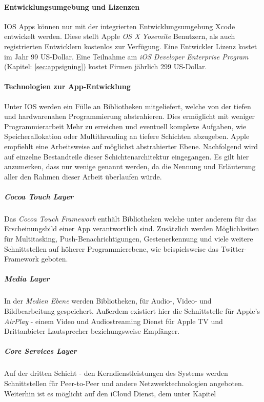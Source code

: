 		\paragraph{Entwicklungsumgebung und Lizenzen}
			IOS Apps können nur mit der integrierten Entwicklungsumgebung Xcode
			entwickelt werden. Diese stellt Apple \textsl{OS X Yosemite}
			Benutzern, als auch registrierten Entwicklern kostenlos zur Verfügung.
			Eine Entwickler Lizenz kostet im Jahr 99 US-Dollar. Eine Teilnahme am
			\textsl{iOS Developer Enterprise Program} (Kapitel: \ref{sec:appsigning})
			kostet Firmen jährlich 299 US-Dollar.
		\paragraph{Technologien zur App-Entwicklung}
			Unter IOS werden ein Fülle an Bibliotheken mitgeliefert, welche von der
			tiefen und hardwarenahen Programmierung abstrahieren. Dies ermöglicht mit weniger
			Programmierarbeit Mehr zu erreichen und eventuell komplexe Aufgaben, wie
			Speicherallokation oder Multithreading an tiefere Schichten abzugeben.
			Apple empfiehlt eine Arbeitsweise auf möglichst abstrahierter Ebene.
			Nachfolgend wird auf einzelne Bestandteile dieser Schichtenarchitektur
			eingegangen. Es gilt hier anzumerken, dass nur wenige genannt werden, da die
			Nennung und Erläuterung aller den Rahmen dieser Arbeit überlaufen würde.
			\subparagraph{Cocoa Touch Layer}
				Das \textsl{Cocoa Touch Framework} enthält Bibliotheken welche unter anderem
				für das Erscheinungsbild einer App verantwortlich sind. Zusätzlich werden
				Möglichkeiten für Multitasking, Push-Benachrichtigungen, Gestenerkennung und
				viele weitere Schnittstellen auf höherer Programmierebene, wie beispielsweise
				das Twitter-Framework geboten.
			\subparagraph{Media Layer}
				In der \textsl{Medien Ebene} werden Bibliotheken, für
				Audio-, Video- und Bildbearbeitung gespeichert. Außerdem existiert hier die
				Schnittstelle für Apple's \textsl{AirPlay} - einem Video und Audiostreaming
				Dienst für Apple TV und Drittanbieter Lautsprecher beziehungsweise Empfänger.
			\subparagraph{Core Services Layer}
				Auf der dritten Schicht - den Kerndienstleistungen des Systems werden
				Schnittstellen für Peer-to-Peer und andere Netzwerktechnologien angeboten.
				Weiterhin ist es möglicht auf den iCloud Dienst, dem unter Kapitel
